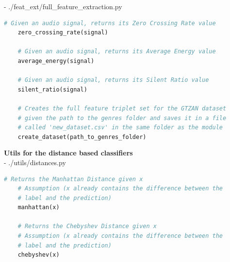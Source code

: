 \documentclass[12pt]{article}
\begin{document}
	- ./feat\_ext/full\_feature\_extraction.py
	
	\begin{lstlisting}[language=Python]
	# Given an audio signal, returns its Zero Crossing Rate value
	zero_crossing_rate(signal)
		
	# Given an audio signal, returns its Average Energy value
	average_energy(signal)
		
	# Given an audio signal, returns its Silent Ratio value
	silent_ratio(signal)
		
	# Creates the full feature triplet set for the GTZAN dataset
	# given the path to the genres folder and saves it in a file
	# called 'new_dataset.csv' in the same folder as the module
	create_dataset(path_to_genres_folder)
	\end{lstlisting}
	\newpage
	\textbf{Utils for the distance based classifiers}\mbox{}\\
	- ./utils/distances.py
	\begin{lstlisting}[language=Python]
	# Returns the Manhattan Distance given x
	# Assumption (x already contains the difference between the
	# label and the prediction)
	manhattan(x)
	
	# Returns the Chebyshev Distance given x
	# Assumption (x already contains the difference between the
	# label and the prediction)
	chebyshev(x)
	\end{lstlisting}
	
\end{document}
